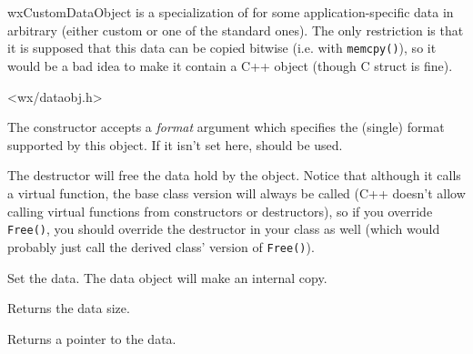 \section{}\label{wxcustomdataobject}

wxCustomDataObject is a specialization of 
 for some
application-specific data in arbitrary (either custom or one of the standard
ones). The only restriction is that it is supposed that this data can be
copied bitwise (i.e. with {\tt memcpy()}), so it would be a bad idea to make
it contain a C++ object (though C struct is fine).




<wx/dataobj.h>




\label{wxcustomdataobjectwxcustomdataobject}


The constructor accepts a {\it format} argument which specifies the (single)
format supported by this object. If it isn't set here, 
 should be used.

\label{wxcustomdataobjectdtor}


The destructor will free the data hold by the object. Notice that although it
calls a virtual  function, the base
class version will always be called (C++ doesn't allow calling virtual
functions from constructors or destructors), so if you override {\tt Free()}, you
should override the destructor in your class as well (which would probably
just call the derived class' version of {\tt Free()}).


\label{wxcustomdataobjectsetdata}


Set the data. The data object will make an internal copy.

\label{wxcustomdataobjectgetsize}


Returns the data size.

\label{wxcustomdataobjectgetdata}


Returns a pointer to the data.


